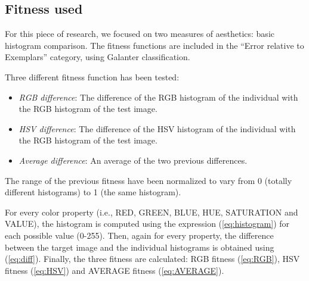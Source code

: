 \documentclass[conference]{IEEEtran}
\begin{document}
\subsection{Fitness used}
For this piece of research, we focused on two measures of aesthetics: basic histogram comparison. The fitness functions are included in the ``Error relative to Exemplars'' category, using Galanter \cite{galanter2012computational} classification.

Three different fitness function has been tested:
\begin{itemize}
\item {\em RGB difference}: The difference of the RGB histogram of the individual with the RGB histogram of the test image.
\item {\em HSV difference}: The difference of the HSV histogram of the individual with the RGB histogram of the test image.
\item {\em Average difference}: An average of the two previous differences.
\end{itemize}

The range of the previous fitness have been normalized to vary from 0 (totally different histograms) to 1 (the same histogram).

For every color property (i.e., RED, GREEN, BLUE, HUE, SATURATION and VALUE), the histogram is computed using the expression (\ref{eq:histogram}) for each possible value (0-255). Then, again for every property, the difference between the target image and the individual histograms is obtained using (\ref{eq:diff}). Finally, the three fitness are calculated: RGB fitness (\ref{eq:RGB}), HSV fitness (\ref{eq:HSV}) and AVERAGE fitness (\ref{eq:AVERAGE}).
\end{document}
